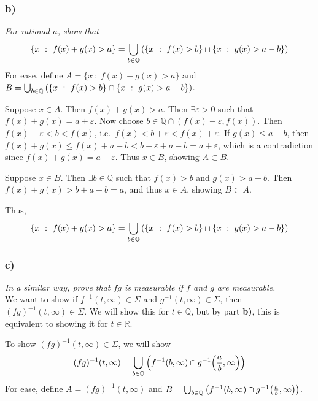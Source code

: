 \documentclass[12pt]{article}
\newcommand{\E}{\varepsilon}
\theoremstyle{plain}
\begin{document}
\subsubsection*{ b)}
\emph{For rational $a$, show that}
\begin{align*}
    \{x\ :\ f(x) + g(x) > a\} = \bigcup_{b \in \mathbb{Q}} \qty(\{x\ :\ f(x) > b\} \cap \{x\ :\ g(x) > a - b\})
\end{align*}
For ease, define $A = \{x\ :\ f(x) + g(x) > a\}$ and $B = \bigcup_{b \in \mathbb{Q}} \qty(\{x\ :\ f(x) > b\} \cap \{x\ :\ g(x) > a - b\})$.

Suppose $x \in A$.  Then $f(x) + g(x) > a$.  Then $\exists \E > 0$ such that $f(x) + g(x) = a + \E$.  Now choose $b \in \mathbb{Q}\cap(f(x) - \E, f(x))$.  Then $f(x) - \E < b < f(x)$, i.e.~$f(x) < b + \E < f(x) + \E$.  If $g(x) \leq a - b$, then $f(x) + g(x) \leq f(x) + a - b < b + \E + a - b = a + \E$, which is a contradiction since $f(x) + g(x) = a + \E$.  Thus $x \in B$, showing $A \subset B$.

Suppose $x \in B$.  Then $\exists b \in \mathbb{Q}$ such that $f(x) > b$ and $g(x) > a - b$.  Then $f(x) + g(x) > b + a - b = a$, and thus $x \in A$, showing $B \subset A$.

Thus,
\begin{align*}
    \{x\ :\ f(x) + g(x) > a\} = \bigcup_{b \in \mathbb{Q}} \qty(\{x\ :\ f(x) > b\} \cap \{x\ :\ g(x) > a - b\})
\end{align*}

\subsubsection*{ c)}
\emph{In a similar way, prove that $fg$ is measurable if $f$ and $g$ are measurable.} \\

We want to show if $f^{-1}(t, \infty) \in \Sigma$ and $g^{-1}(t, \infty) \in \Sigma$, then $(fg)^{-1}(t, \infty) \in \Sigma$.  We will show this for $t \in \mathbb{Q}$, but by part \textbf{b)}, this is equivalent to showing it for $t \in \mathbb{R}$.

To show $(fg)^{-1}(t, \infty) \in \Sigma$, we will show
\begin{align*}
    (fg)^{-1}(t, \infty) = \bigcup_{b \in \mathbb{Q}}\qty(f^{-1}(b, \infty)\cap g^{-1}\qty(\frac{a}{b}, \infty))
\end{align*}
For ease, define $A = (fg)^{-1}(t, \infty)$ and $B = \bigcup_{b \in \mathbb{Q}}\qty(f^{-1}(b, \infty)\cap g^{-1}\qty(\frac{a}{b}, \infty))$.
\end{document}
